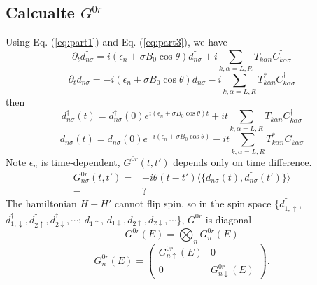 \documentclass[11pt,a4paper]{article}
\begin{document}
\subsection{Calcualte $G^{0r}$}
Using Eq. (\ref{eq:part1}) and Eq. (\ref{eq:part3}), we have
\begin{equation}
\partial_{t}d_{n\sigma}^{\dag} =i(\epsilon_{n}+\sigma B_{0} \cos \theta) d_{n\sigma}^{\dag} + i\sum_{k, \alpha=L, R}T_{k \alpha n} C_{k \alpha \sigma}^{\dag}
\end{equation}
\begin{equation}
\partial_{t}d_{n\sigma} =-i(\epsilon_{n}+\sigma B_{0} \cos \theta) d_{n\sigma} - i\sum_{k, \alpha=L, R}T_{k \alpha n}^{*} C_{k \alpha \sigma}^{\dag}
\end{equation}
then
\begin{equation}
d_{n\sigma}^{\dag}(t) =d_{n\sigma}^{\dag}(0) e^{i(\epsilon_{n}+\sigma B_{0} \cos \theta)t}  + it\sum_{k, \alpha=L, R}T_{k \alpha n} C_{k \alpha \sigma}^{\dag}
\end{equation}
\begin{equation}
d_{n\sigma}(t) =d_{n\sigma}(0)e^{-i(\epsilon_{n}+\sigma B_{0} \cos \theta)} - it\sum_{k, \alpha=L, R}T_{k \alpha n}^{*} C_{k \alpha \sigma}
\end{equation}
Note $\epsilon_{n}$ is time-dependent, $G^{0r}(t,t')$ depends only on time difference. 
\begin{equation}
\begin{split}
G_{n\sigma}^{0r}(t,t') =& -i\theta(t-t')\langle \{d_{n\sigma}(t),d_{n\sigma}^{\dag}(t')\} \rangle \\
=&?
\end{split}
\end{equation}
The hamiltonian $H-H'$ cannot flip spin, so in the spin space \{$d_{1,\uparrow}^{\dag}$, $d_{1,\downarrow}^{\dag}, d_{2\uparrow}^{\dag}, d_{2\downarrow}^{\dag}, \cdots$; $d_{1\uparrow}$, $d_{1\downarrow}, d_{2\uparrow}, d_{2\downarrow}, \cdots$\}, $G^{0r}$ is diagonal
\begin{equation}
G^{0r}(E)=\bigotimes_{n}G_{n}^{0r}(E)
\end{equation}
\begin{equation}
G_{n}^{0r}(E) = \left(\begin{array}{cc}
G_{n\uparrow}^{0r}(E) &0 \\
0 & G_{n\downarrow}^{0r}(E)
\end{array}\right).
\end{equation}
\end{document}
